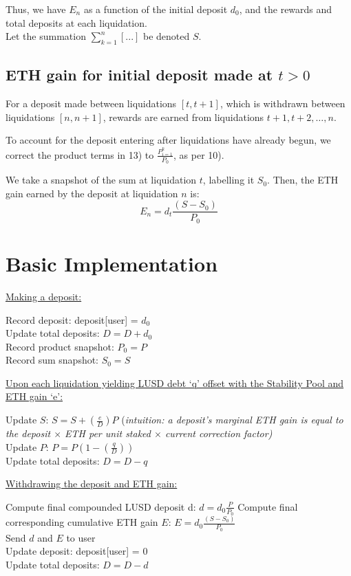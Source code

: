 \documentclass[reqno]{article}
\begin{document}
\bigskip
Thus, we have $E_n$ as a function of the initial deposit $d_0$, and the rewards and total deposits at
each liquidation.\\
Let the summation $\displaystyle\sum^n_{k=1}[...]$ be denoted  {$S$}.

\bigskip
\subsection{ETH gain for initial deposit made at $t>0$}

\bigskip
For a deposit made between liquidations $[t, t+1]$, which is withdrawn between liquidations $[n, n
+1]$, rewards are earned from liquidations $t+1, t+2, \ldots, n$.

\bigskip
To account for the deposit entering after liquidations have already begun, we correct the product
terms in 13) to $\frac{P^k_{i = 1}}{P_0}$, as per 10).

\bigskip
We take a snapshot of the sum at liquidation $t$, labelling it {$S_0$}. Then, the ETH gain earned by the deposit at liquidation $n$ is:
\begin{equation} 
E_n=d_t\frac{(S-S_0)}{P_0}
\end{equation}

\bigskip
\section{Basic Implementation}
\underline{Making a deposit:}

Record deposit: deposit[user] = {$d_0$}\\
Update total deposits: {$D = D + d_0$}\\
Record product snapshot: {$P_0 = P$}\\
Record sum snapshot: {$S_0 = S$}

\bigskip
\underline{Upon each liquidation yielding LUSD debt ‘q’ offset with the Stability Pool and ETH gain ‘e’:}

Update $S$: {$S = S + (\frac{e}{D})P$} (\textit{intuition: a deposit’s marginal ETH gain is equal to the deposit $\times$ ETH per unit staked $\times$ current correction factor)}\\
Update $P$: {$P = P(1- (\frac{q}{D}))$}\\
Update total deposits: {$D = D - q$}

\bigskip
\underline{Withdrawing the deposit and ETH gain:}

Compute final compounded LUSD deposit d: {$d = d_0\frac{P}{P_0}$}
Compute final corresponding cumulative ETH gain $E$: {$E = d_0\frac{(S - S_0)}{P_0}$}\\
Send {$d$} and {$E$} to user\\
Update deposit: deposit[user] = 0\\
Update total deposits: {$D = D - d$}\\
\end{document}
